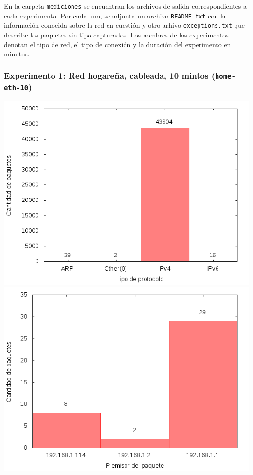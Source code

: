 En la carpeta \texttt{mediciones} se encuentran los archivos de salida correspondientes a cada
experimento. Por cada uno, se adjunta un archivo \texttt{README.txt} con la información conocida
sobre la red en cuestión y otro arhivo \texttt{exceptions.txt} que describe los paquetes sin tipo
capturados. Los nombres de los experimentos denotan el tipo de red, el tipo de conexión y la
duración del experimento en minutos.

\subsubsection{Experimento 1: Red hogareña, cableada, 10 mintos (\texttt{home-eth-10})}

\includegraphics{../mediciones/home-eth-10/home-eth-10Protocolos.png}
\includegraphics{../mediciones/home-eth-10/home-eth-10IpsSrcArp.png}
